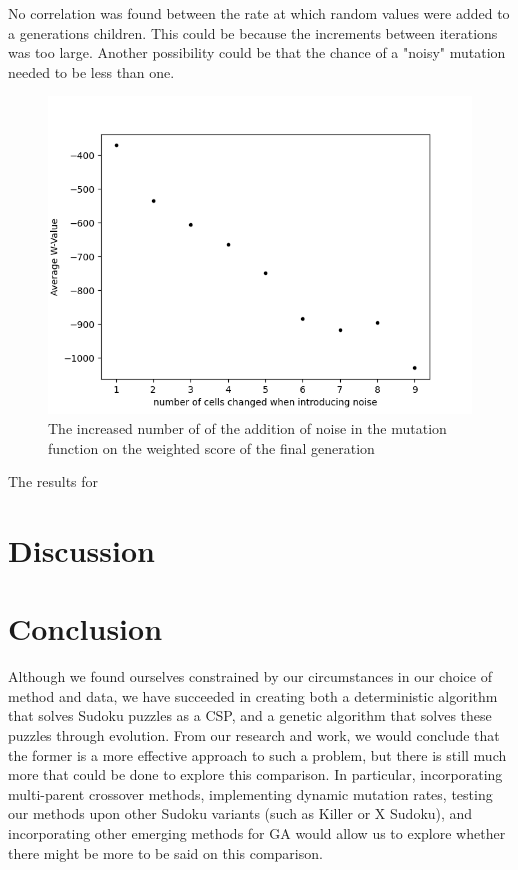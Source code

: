 \documentclass[12pt, conference]{IEEEtran}
\begin{document}
\par
No correlation was found between the rate at which random values were added to a generations children.
This could be because the increments between iterations was too large.
Another possibility could be that the chance of a "noisy" mutation needed to be less than one.


\begin{figure}[H]
\centerline{\includegraphics[scale=0.5]{Figures/Mutation_Number_Averages.png}}
\caption{The increased number of   of the addition of noise in the mutation function on the weighted score of the final generation}
\label{fig. 2}
\end{figure}

\par
The results for 

\section{Discussion}



\section{Conclusion}

Although we found ourselves constrained by our circumstances in our choice of method and data, we have succeeded in creating both a deterministic algorithm that solves Sudoku puzzles as a CSP, and a genetic algorithm that solves these puzzles through evolution.
 From our research and work, we would conclude that the former is a more effective approach to such a problem, but there is still much more that could be done to explore this comparison. 
In particular, incorporating multi-parent crossover methods, implementing dynamic mutation rates, testing our methods upon other Sudoku variants (such as Killer or X Sudoku), and incorporating other emerging methods for GA would allow us to explore whether there might be more to be said on this comparison.
\end{document}
